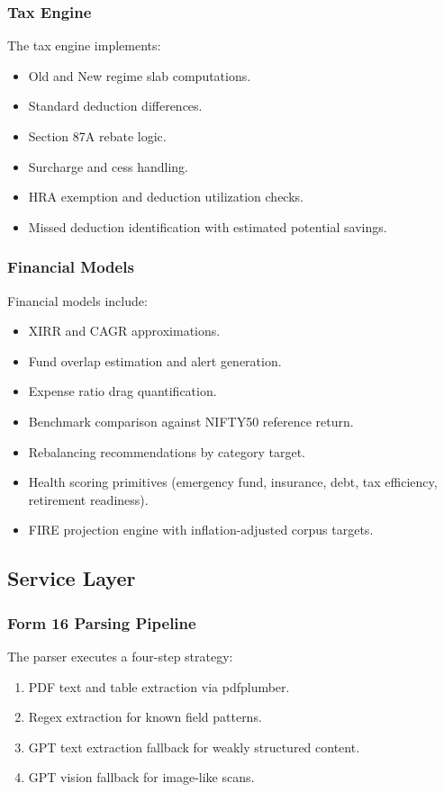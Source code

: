 \documentclass[12pt,a4paper]{article}
\begin{document}
\subsubsection{Tax Engine}
The tax engine implements:
\begin{itemize}
	\item Old and New regime slab computations.
	\item Standard deduction differences.
	\item Section 87A rebate logic.
	\item Surcharge and cess handling.
	\item HRA exemption and deduction utilization checks.
	\item Missed deduction identification with estimated potential savings.
\end{itemize}

\subsubsection{Financial Models}
Financial models include:
\begin{itemize}
	\item XIRR and CAGR approximations.
	\item Fund overlap estimation and alert generation.
	\item Expense ratio drag quantification.
	\item Benchmark comparison against NIFTY50 reference return.
	\item Rebalancing recommendations by category target.
	\item Health scoring primitives (emergency fund, insurance, debt, tax efficiency, retirement readiness).
	\item FIRE projection engine with inflation-adjusted corpus targets.
\end{itemize}

\subsection{Service Layer}
\subsubsection{Form 16 Parsing Pipeline}
The parser executes a four-step strategy:
\begin{enumerate}
	\item PDF text and table extraction via pdfplumber.
	\item Regex extraction for known field patterns.
	\item GPT text extraction fallback for weakly structured content.
	\item GPT vision fallback for image-like scans.
\end{enumerate}
\end{document}
